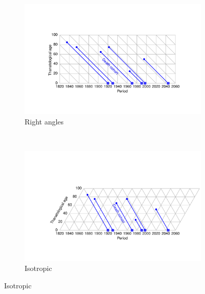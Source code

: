 \documentclass[11pt,oneside,a4paper]{article} %
\begin{document}
\begin{figure} 
\caption{A TPD diagram in two projections.}
\label{fig:TPD}
\centering
\begin{subfigure}{1.1\textwidth}
\caption{Right angles}
\vspace{-6em}
\label{fig:TPDrt}
\includegraphics[scale=0.6]{Figures/TPDrt.pdf}
\end{subfigure}
\\\vspace{-2em}
\begin{subfigure}{1.1\textwidth}
\caption{Isotropic}
\vspace{-6em}
\label{fig:TPDeq}
\includegraphics[scale=0.6]{Figures/TPDeq.pdf}
\end{subfigure}
\end{figure} 

\FloatBarrier
\end{document}
